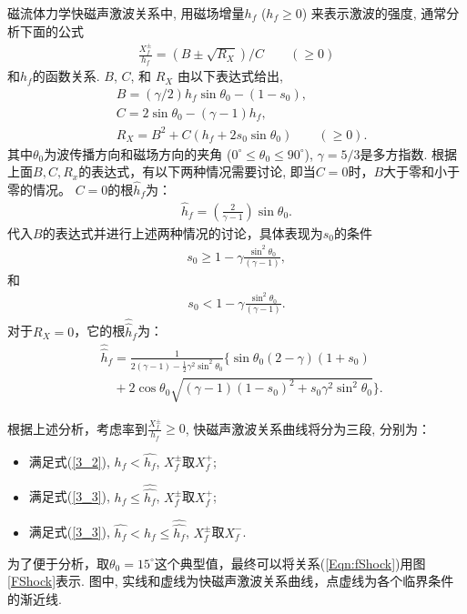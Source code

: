 \documentclass{article}
\begin{document}
	磁流体力学快磁声激波关系中\citep{Jeffrey1964}, 用磁场增量$h_f$ ($h_f \ge 0$)
	来表示激波的强度, 通常分析下面的公式
	\begin{align}
		\frac{X_f^\pm}{h_f} = (B \pm \sqrt{R_X})/C \qquad (\ge 0) \label{Eqn:fShock}
	\end{align}
	和$h_f$的函数关系. $B$, $C$, 和 $R_X$ 由以下表达式给出,
	\begin{align}
		& B = (\gamma/2) h_f \sin\theta_0 - (1-s_0),
		\\
		& C = 2 \sin\theta_0 - (\gamma-1) h_f,
		\\
		& R_X = B^2 + C(h_f + 2 s_0 \sin\theta_0) \qquad (\ge 0).
	\end{align}
	其中$\theta_0$为波传播方向和磁场方向的夹角 ($0^\circ \le \theta_0 \le 90^\circ$),
	$\gamma=5/3$是多方指数. 根据上面$B, C, R_x$的表达式，有以下两种情况需要讨论, 即当$C=0$时，$B$大于零和小于零的情况。
	$C=0$的根$\hat{h}_f$为：
	\begin{align}\label{3_1}
		\hat{h}_f = \left(\frac{2}{\gamma-1}\right) \sin\theta_0.
	\end{align}
	代入$B$的表达式并进行上述两种情况的讨论，具体表现为$s_0$的条件
	\begin{align}\label{3_2}
		s_0 \ge 1 - \gamma \frac{\sin^2\theta_0}{(\gamma-1)},
	\end{align}
	和
	\begin{align}\label{3_3}
		s_0 < 1 - \gamma \frac{\sin^2\theta_0}{(\gamma-1)}.
	\end{align}
	对于$R_X = 0$，它的根$\hat{\hat{h}}_f$为：
	\begin{align}\label{3_4}
		& \hat{\hat{h}}_f = \frac{1}{2(\gamma-1) - \frac{1}{2} \gamma^2 \sin^2
			\theta_0}\Big\{\sin\theta_0
		(2-\gamma)(1+s_0) \nonumber
		\\
		& \quad + 2\cos\theta_0 \sqrt{(\gamma-1)(1-s_0)^2 + s_0 \gamma^2 \sin^2\theta_0}\Big\}.
	\end{align}
	
	根据上述分析，考虑率到$\frac{X^{\pm}_f}{h_f}\ge 0$, 快磁声激波关系曲线将分为三段, 分别为：
	\begin{itemize}
		\item 满足式(\ref{3_2}), $h_f<\hat{h_f}$, $X^{\pm}_f$取$X^+_f$;
		\item 满足式(\ref{3_3}), $h_f\le \hat{\hat{h_f}}$, $X^{\pm}_f$取$X^+_f$;
		\item 满足式(\ref{3_3}), $\hat{h_f}<h_f\le \hat{\hat{h_f}}$, $X^{\pm}_f$取$X^-_f$.
	\end{itemize}

	为了便于分析，取$\theta_0=15^\circ$这个典型值，最终可以将关系(\ref{Eqn:fShock})用图
	\ref{FShock}表示. 图中, 实线和虚线为快磁声激波关系曲线，点虚线为各个临界条件的渐近线.
	
\end{document}
